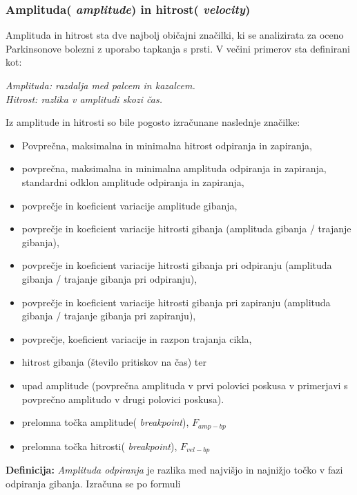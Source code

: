 \documentclass[
]{article}
\providecommand{\tightlist}{%
  \setlength{\itemsep}{0pt}\setlength{\parskip}{0pt}}
\begin{document}
\subsubsection{\texorpdfstring{Amplituda( \emph{amplitude}) in hitrost(
\emph{velocity})}{Amplituda( amplitude) in hitrost( velocity)}}\label{amplituda-amplitude-in-hitrost-velocity}

Amplituda in hitrost sta dve najbolj običajni značilki, ki se
analizirata za oceno Parkinsonove bolezni z uporabo tapkanja s prsti. V
večini primerov sta definirani kot:

\emph{Amplituda: razdalja med palcem in kazalcem.}\\
\emph{Hitrost: razlika v amplitudi skozi čas.}

Iz amplitude in hitrosti so bile pogosto izračunane naslednje značilke:

\begin{itemize}
\tightlist
\item
  Povprečna, maksimalna in minimalna hitrost odpiranja in zapiranja,
\item
  povprečna, maksimalna in minimalna amplituda odpiranja in zapiranja,
  standardni odklon amplitude odpiranja in zapiranja,
\item
  povprečje in koeficient variacije amplitude gibanja,
\item
  povprečje in koeficient variacije hitrosti gibanja (amplituda gibanja
  / trajanje gibanja),
\item
  povprečje in koeficient variacije hitrosti gibanja pri odpiranju
  (amplituda gibanja / trajanje gibanja pri odpiranju),
\item
  povprečje in koeficient variacije hitrosti gibanja pri zapiranju
  (amplituda gibanja / trajanje gibanja pri zapiranju),
\item
  povprečje, koeficient variacije in razpon trajanja cikla,
\item
  hitrost gibanja (število pritiskov na čas) ter
\item
  upad amplitude (povprečna amplituda v prvi polovici poskusa v
  primerjavi s povprečno amplitudo v drugi polovici poskusa).
\item
  prelomna točka amplitude( \emph{breakpoint}), \(F_{amp- bp}\)
\item
  prelomna točka hitrosti( \emph{breakpoint}), \(F_{vel- bp}\)
\end{itemize}

\textbf{Definicija:} \emph{Amplituda odpiranja} je razlika med najvišjo
in najnižjo točko v fazi odpiranja gibanja. Izračuna se po formuli
\end{document}
